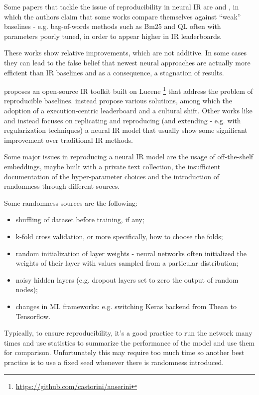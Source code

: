 Some papers that tackle the issue of reproducibility in neural IR are \cite{neurhype} and \cite{anserini}, in which the authors claim that some works compare themselves against ``weak'' baselines - e.g. bag-of-words methods such as Bm25 and QL often with parameters poorly tuned, in order to appear higher in IR leaderboards.

These works show relative improvements, which are not additive. In some cases they can lead to the false belief that newest neural approaches are actually more efficient than IR baselines and as a consequence, a stagnation of results.

\cite{anserini} proposes an open-source IR toolkit built on Lucene \footnote{\url{https://github.com/castorini/anserini}} that address the problem of reproducible baselines. \cite{neurhype} instead propose various solutions, among which the adoption of a execution-centric leaderboard and a cultural shift. Other works like \cite{reproconvneurir} and \cite{axiomneuir} instead focuses on replicating and reproducing (and extending - e.g. with regularization techniques) a neural IR model that usually show some significant improvement over traditional IR methods.

Some major issues in reproducing a neural IR model are the usage of off-the-shelf embeddings, maybe built with a private text collection, the insufficient documentation of the hyper-parameter choices and the introduction of randomness through different sources.

Some randomness sources are the following:

\begin{itemize}
\item shuffling of dataset before training, if any;
\item k-fold cross validation, or more specifically, how to choose the folds;
\item random initialization of layer weights - neural networks often initialized the weights of their
layer with values sampled from a particular distribution;
\item noisy hidden layers (e.g. dropout layers set to zero the output of random nodes);
\item changes in ML frameworks: e.g. switching Keras backend from Thean to Tensorflow.
\end{itemize}

Typically, to ensure reproducibility, it's a good practice to run the network many times and use statistics to summarize the performance of the model and use them for comparison. Unfortunately this may require too much time so another best practice is to use a fixed seed whenever there is randomness introduced.
